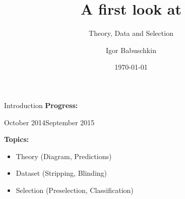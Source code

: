 \documentclass[compress,aspectratio=1610]{beamer}
\title{A first look at \HepProcess{\PB\to\APD\Pmu\Pmu}}
\subtitle{Theory, Data and Selection}
\date{\today}
\author{Igor Babuschkin}
\begin{document}
\maketitle

\begin{frame}{Introduction}
  \textbf{Progress:}

  \begin{center}
  October 2014\hspace{1em}September 2015
  \end{center}
  
  \textbf{Topics:}
  \begin{itemize}
    \item Theory (Diagram, Predictions)
    \item Dataset (Stripping, Blinding)
    \item Selection (Preselection, Classification)
  \end{itemize}
\end{frame}
\end{document}
